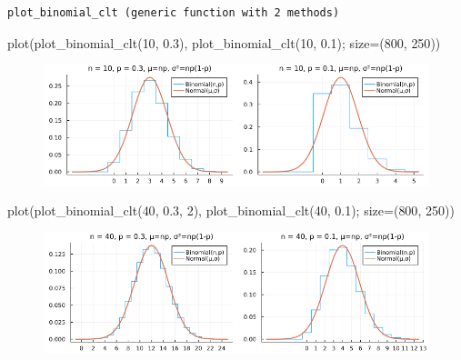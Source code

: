 \documentclass[
  letterpaper,
  DIV=11,
  numbers=noendperiod]{scrartcl}
\newenvironment{Shaded}{\begin{snugshade}}{\end{snugshade}}
\newcommand{\FloatTok}[1]{\textcolor[rgb]{0.68,0.00,0.00}{#1}}
\newcommand{\FunctionTok}[1]{\textcolor[rgb]{0.28,0.35,0.67}{#1}}
\newcommand{\NormalTok}[1]{\textcolor[rgb]{0.00,0.23,0.31}{#1}}
\newcommand{\OperatorTok}[1]{\textcolor[rgb]{0.37,0.37,0.37}{#1}}
\begin{document}
\begin{verbatim}
plot_binomial_clt (generic function with 2 methods)
\end{verbatim}

\begin{Shaded}
\begin{Highlighting}[]
\FunctionTok{plot}\NormalTok{(}\FunctionTok{plot\_binomial\_clt}\NormalTok{(}\FloatTok{10}\NormalTok{, }\FloatTok{0.3}\NormalTok{), }\FunctionTok{plot\_binomial\_clt}\NormalTok{(}\FloatTok{10}\NormalTok{, }\FloatTok{0.1}\NormalTok{); size}\OperatorTok{=}\NormalTok{(}\FloatTok{800}\NormalTok{, }\FloatTok{250}\NormalTok{))}
\end{Highlighting}
\end{Shaded}

\begin{figure}[H]

{\centering \includegraphics{05 Central limit theorem_files/figure-pdf/cell-25-output-1.png}

}

\end{figure}

\begin{Shaded}
\begin{Highlighting}[]
\FunctionTok{plot}\NormalTok{(}\FunctionTok{plot\_binomial\_clt}\NormalTok{(}\FloatTok{40}\NormalTok{, }\FloatTok{0.3}\NormalTok{, }\FloatTok{2}\NormalTok{), }\FunctionTok{plot\_binomial\_clt}\NormalTok{(}\FloatTok{40}\NormalTok{, }\FloatTok{0.1}\NormalTok{); size}\OperatorTok{=}\NormalTok{(}\FloatTok{800}\NormalTok{, }\FloatTok{250}\NormalTok{))}
\end{Highlighting}
\end{Shaded}

\begin{figure}[H]

{\centering \includegraphics{05 Central limit theorem_files/figure-pdf/cell-26-output-1.png}

}

\end{figure}
\end{document}
